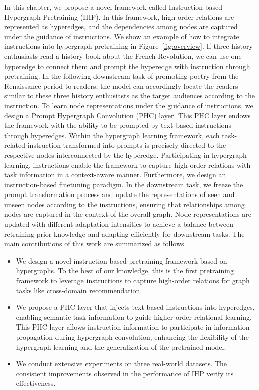 In this chapter, we propose a novel framework called Instruction-based Hypergraph Pretraining (IHP).
In this framework, high-order relations are represented as hyperedges, and the dependencies among nodes are captured under the guidance of instructions.
We show an example of how to integrate instructions into hypergraph pretraining in Figure~\ref{fig:overview}.
If three history enthusiasts read a history book about the French Revolution, we can use one hyperedge to connect them and prompt the hyperedge with instruction through pretraining.
In the following downstream task of promoting poetry from the Renaissance period to readers, the model can accordingly locate the readers similar to these three history enthusiasts as the target audiences according to the instruction. 
To learn node representations under the guidance of instructions, we design a Prompt Hypergraph Convolution (PHC) layer. 
This PHC layer endows the framework with the ability to be prompted by text-based instructions through hyperedges. 
Within the hypergraph learning framework, each task-related instruction transformed into prompts is precisely directed to the respective nodes interconnected by the hyperedge. 
Participating in hypergraph learning, instructions enable the framework to capture high-order relations with task information in a context-aware manner. 
Furthermore, we design an instruction-based finetuning paradigm. 
In the downstream task, we freeze the prompt transformation process and update the representations of seen and unseen nodes according to the instructions, ensuring that relationships among nodes are captured in the context of the overall graph. 
Node representations are updated with different adaptation intensities to achieve a balance between retraining prior knowledge and adapting efficiently for downstream tasks. The main contributions of this work are summarized as follows.
\begin{itemize}[left=0pt]
\item We design a novel instruction-based pretraining framework based on hypergraphs. To the best of our knowledge, this is the first pretraining framework to leverage instructions to capture high-order relations for graph tasks like cross-domain recommendation.
\item  We propose a PHC layer that injects text-based instructions into hyperedges, enabling semantic task information to guide higher-order relational learning. This PHC layer allows instruction information to participate in information propagation during hypergraph convolution, enhancing the flexibility of the hypergraph learning and the generalization of the pretrained model.
\item We conduct extensive experiments on three real-world datasets. The consistent improvements observed in the performance of IHP verify its effectiveness.
\end{itemize}

